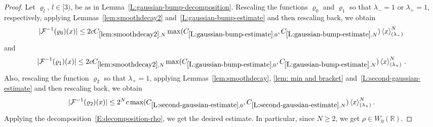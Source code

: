 \documentclass[12pt,reqno]{amsart}
\theoremstyle{plain}
\numberwithin{equation}{section}
\theoremstyle{remark}
\newcommand{\R}{{\mathbb R}}
\begin{document}
\begin{proof}
Let $\varrho_l$, $l\in [3)$, be as in Lemma~\ref{L:gaussian-bump-decomposition}.
Rescaling the functions $\varrho_0$ and $\varrho_1$ so that $\lambda_{-}=1$ or $\lambda_{+}=1$, respectively, applying Lemmas~\ref{lem:smoothdecay2} and~\ref{L:gaussian-bump-estimate} and then rescaling back, we obtain
\begin{equation*}
     |\mathcal{F}^{-1}(\varrho_0)(x)|\le 2cC_{\ref{lem:smoothdecay2},N}\max(C_{\ref{L:gaussian-bump-estimate},0},C_{\ref{L:gaussian-bump-estimate},N}) \left<x\right>_{(\lambda_{-})}^N\,
\end{equation*}
and
\begin{equation*}
     |\mathcal{F}^{-1}(\varrho_1)(x)|\le 2cC_{\ref{lem:smoothdecay2},N}\max(C_{\ref{L:gaussian-bump-estimate},0},C_{\ref{L:gaussian-bump-estimate},N}) \left<x\right>_{(\lambda_{+})}^N\,.
\end{equation*}
Also, rescaling the function $\varrho_2$ so that $\lambda_{+}=1$, applying Lemmas~\ref{lem:smoothdecay}, \ref{lem: min and bracket} and~\ref{L:second-gaussian-estimate} and then rescaling back, we obtain
\begin{equation*}
     |\mathcal{F}^{-1}(\varrho_2)(x)|\le 2^Nc\max(C_{\ref{L:second-gaussian-estimate},0},C_{\ref{L:second-gaussian-estimate},N}) \left<x\right>_{(\lambda_{+})}^N.
\end{equation*}
Applying the decomposition~\eqref{E:decomposition-rho}, we get the desired estimate. In particular, since $N\geq 2$, we get $\rho \in W_0(\R)$.
\end{proof}
\end{document}
